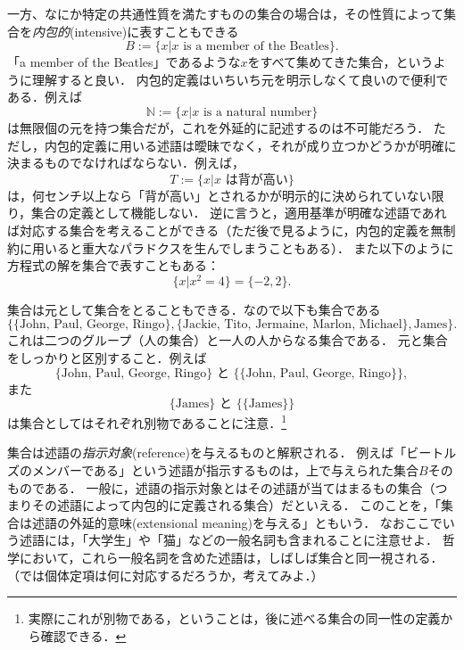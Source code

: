 \documentclass[11pt,a4paper]{jsarticle}
\begin{document}
一方、なにか特定の共通性質を満たすものの集合の場合は，その性質によって集合を\emph{内包的}(intensive)に表すこともできる
\[
 B := \{x | x \text{ is a member of the Beatles}\}.
\]
「a member of the Beatles」であるような$x$をすべて集めてきた集合，というように理解すると良い．
内包的定義はいちいち元を明示しなくて良いので便利である．例えば
\[
 \mathbb{N} := \{x | x \text{ is a natural number}\}
\]
は無限個の元を持つ集合だが，これを外延的に記述するのは不可能だろう．
ただし，内包的定義に用いる述語は曖昧でなく，それが成り立つかどうかが明確に決まるものでなければならない．例えば，
\[
 T := \{x | x \text{ は背が高い}\}
\]
は，何センチ以上なら「背が高い」とされるかが明示的に決められていない限り，集合の定義として機能しない．
逆に言うと，適用基準が明確な述語であれば対応する集合を考えることができる（ただ後で見るように，内包的定義を無制約に用いると重大なパラドクスを生んでしまうこともある）．
また以下のように方程式の解を集合で表すこともある：
\[
 \{ x | x^2 = 4\} = \{ -2, 2 \}.
\]


集合は元として集合をとることもできる．なので以下も集合である
\[
\{ \{\text{John, Paul, George, Ringo}\}, \{ \text{Jackie, Tito, Jermaine, Marlon, Michael}\}, \text{James} \}.
\]
これは二つのグループ（人の集合）と一人の人からなる集合である．
元と集合をしっかりと区別すること．例えば
\[
\{\text{John, Paul, George, Ringo}\} \text{ と } \{ \{\text{John, Paul, George, Ringo}\} \},
\]
また
\[
\{\text{James}\} \text{ と } \{ \{\text{James}\} \}  
\]
は集合としてはそれぞれ別物であることに注意．\footnote{実際にこれが別物である，ということは，後に述べる集合の同一性の定義から確認できる．}



\begin{example}
集合は述語の\emph{指示対象}(reference)を与えるものと解釈される．
例えば「ビートルズのメンバーである」という述語が指示するものは，上で与えられた集合$B$そのものである．
一般に，述語の指示対象とはその述語が当てはまるもの集合（つまりその述語によって内包的に定義される集合）だといえる．
このことを，「集合は述語の外延的意味(extensional meaning)を与える」ともいう．
なおここでいう述語には，「大学生」や「猫」などの一般名詞も含まれることに注意せよ．
哲学において，これら一般名詞を含めた述語は，しばしば集合と同一視される．
（では個体定項は何に対応するだろうか，考えてみよ．）
\end{example}
\end{document}
